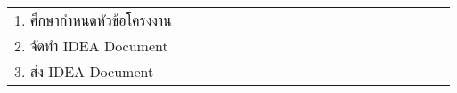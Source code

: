 \documentclass[12pt,oneside,openright,a4paper]{cpe-thai-project}
\begin{document}
\begin{table}[!h]
\begin{tabular}{llllllllllllllllllll}
\multicolumn{1}{|l|}{1. ศึกษากำหนดหัวข้อโครงงาน}                                                             & \multicolumn{1}{c|}{\cellcolor[HTML]{FFFC9E}} & \multicolumn{1}{c|}{}                         & \multicolumn{1}{l|}{}                         & \multicolumn{1}{l|}{}                         & \multicolumn{1}{l|}{}                         & \multicolumn{1}{l|}{}                         & \multicolumn{1}{l|}{}                         & \multicolumn{1}{l|}{}                         & \multicolumn{1}{l|}{}                         & \multicolumn{1}{l|}{}                         & \multicolumn{1}{l|}{}                         & \multicolumn{1}{l|}{}                         & \multicolumn{1}{l|}{}                         & \multicolumn{1}{l|}{}                         & \multicolumn{1}{l|}{}                         & \multicolumn{1}{l|}{}                         & \multicolumn{1}{l|}{}                         & \multicolumn{1}{l|}{}                         &  \\ \cline{1-19}
\multicolumn{1}{|l|}{2. จัดทำ IDEA Document}                                                                 & \multicolumn{1}{c|}{\cellcolor[HTML]{FFFC9E}} & \multicolumn{1}{c|}{\cellcolor[HTML]{FFFC9E}} & \multicolumn{1}{l|}{}                         & \multicolumn{1}{l|}{}                         & \multicolumn{1}{l|}{}                         & \multicolumn{1}{l|}{}                         & \multicolumn{1}{l|}{}                         & \multicolumn{1}{l|}{}                         & \multicolumn{1}{l|}{}                         & \multicolumn{1}{l|}{}                         & \multicolumn{1}{l|}{}                         & \multicolumn{1}{l|}{}                         & \multicolumn{1}{l|}{}                         & \multicolumn{1}{l|}{}                         & \multicolumn{1}{l|}{}                         & \multicolumn{1}{l|}{}                         & \multicolumn{1}{l|}{}                         & \multicolumn{1}{l|}{}                         &  \\ \cline{1-19}
\multicolumn{1}{|l|}{3. ส่ง IDEA Document}                                                                   & \multicolumn{1}{c|}{}                         & \multicolumn{1}{c|}{\cellcolor[HTML]{FFFC9E}} & \multicolumn{1}{l|}{}                         & \multicolumn{1}{l|}{}                         & \multicolumn{1}{l|}{}                         & \multicolumn{1}{l|}{}                         & \multicolumn{1}{l|}{}                         & \multicolumn{1}{l|}{}                         & \multicolumn{1}{l|}{}                         & \multicolumn{1}{l|}{}                         & \multicolumn{1}{l|}{}                         & \multicolumn{1}{l|}{}                         & \multicolumn{1}{l|}{}                         & \multicolumn{1}{l|}{}                         & \multicolumn{1}{l|}{}                         & \multicolumn{1}{l|}{}                         & \multicolumn{1}{l|}{}                         & \multicolumn{1}{l|}{}                         &  \\ \cline{1-19}

\end{tabular}
\end{table}
\end{document}
